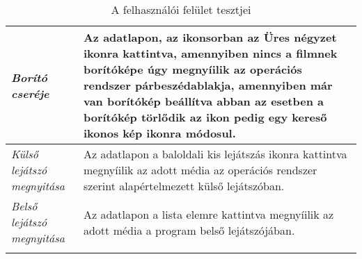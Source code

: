 \begin{center}
\begin{longtable}{ | p{} | p{} | }
        \emph{Borító cseréje}
		& Az adatlapon, az ikonsorban az Üres négyzet ikonra kattintva, amennyiben nincs a filmnek borítóképe úgy megnyíilik az operációs rendszer párbeszédablakja, amennyiben már van borítókép beállítva abban az esetben a borítókép törlődik az ikon pedig egy kereső ikonos kép ikonra módosul.
		\\ \hline

        \emph{Külső lejátszó megnyitása}
		& Az adatlapon a baloldali kis lejátszás ikonra kattintva megnyíilik az adott média az operációs rendszer szerint alapértelmezett külső lejátszóban.
		\\ \hline

        \emph{Belső lejátszó megnyitása}
		& Az adatlapon a lista elemre kattintva megnyíilik az adott média a program belső lejátszójában.
		\\ \hline

		\caption{A felhasználói felület tesztjei}
		\label{tab:ui_tests}
	\end{longtable}
\end{center}
